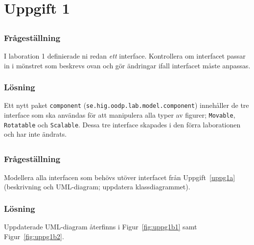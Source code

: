 %
%

\section{Uppgift 1}\label{sec:uppg1}

\subsection{}\label{sec:uppg1a}
\subsubsection*{Frågeställning}
I laboration 1 definierade ni redan \emph{ett} interface. Kontrollera om
interfacet passar in i mönstret som beskrevs ovan och gör ändringar ifall
interfacet måste anpassas.

\subsubsection*{Lösning}
Ett nytt paket \texttt{component} (\texttt{se.hig.oodp.lab.model.component})
innehåller de tre interface som ska användas för att manipulera alla typer av
figurer; \texttt{Movable}, \texttt{Rotatable} och \texttt{Scalable}.
Dessa tre interface skapades i den förra laborationen och har inte ändrats.


\subsection{}\label{sec:uppg1b}
\subsubsection*{Frågeställning}
Modellera alla interfacen som behövs utöver interfacet från
Uppgift~\ref{uppg1a} (beskrivning och UML-diagram; uppdatera klassdiagrammet).

\subsubsection*{Lösning}
Uppdaterade UML-diagram återfinns i Figur~\ref{fig:uppg1b1} samt
Figur~\ref{fig:uppg1b2}.

